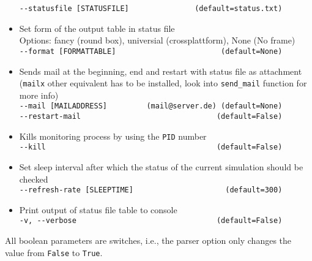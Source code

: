 \begin{itemize}
          \texttt{-\/-statusfile [STATUSFILE]~~~~~~~~~~~~~~~(default=status.txt)}
    \item Set form of the output table in status file\\
          Options: fancy (round box), universial (crossplattform), None (No frame)\\
          \texttt{-\/-format [FORMATTABLE]~~~~~~~~~~~~~~~~~~~~~~~~(default=None)}
    \item Sends mail at the beginning, end and restart with status file as attachment\\
          (\texttt{mailx} other equivalent has to be installed, look into \texttt{send\_mail} function for more info)\\
          \texttt{-\/-mail [MAILADDRESS]~~~~~~~~~(mail@server.de)~(default=None)}\\
          \texttt{-\/-restart-mail ~~~~~~~~~~~~~~~~~~~~~~~~~~~~~~(default=False)}
    \item Kills monitoring process by using the \texttt{PID} number\\
          \texttt{-\/-kill~~~~~~~~~~~~~~~~~~~~~~~~~~~~~~~~~~~~~~~(default=False)}
    \item Set sleep interval after which the status of the current simulation should be checked\\
          \texttt{-\/-refresh-rate [SLEEPTIME]~~~~~~~~~~~~~~~~~~~~~(default=300)}
    \item Print output of status file table to console\\
          \texttt{-v, -\/-verbose~~~~~~~~~~~~~~~~~~~~~~~~~~~~~~~\,(default=False)}
\end{itemize}
All boolean parameters are switches, i.e., the parser option only changes the value from \texttt{False} to \texttt{True}.

